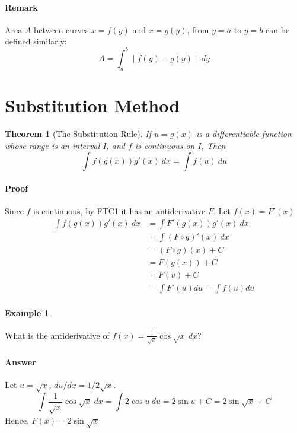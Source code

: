 \documentclass[12pt]{article}
\newtheorem{theorem}{Theorem}
\begin{document}
\paragraph{Remark} Area $A$ between curves $x = f(y)$ and $x = g(y)$, from $y = a$ to $y = b$ can be defined similarly:
\[
    A = \int_a^b \mid f(y) - g(y) \mid\: dy
\]

\section{Substitution Method}
\begin{theorem}[The Substitution Rule]
    If $u = g(x)$ is a differentiable function whose range is an interval $I$, and $f$ is continuous on $I$, Then
    \[
        \int f(g(x))g'(x)\: dx= \int f(u)\: du
    \]
\end{theorem}
\paragraph{Proof}
Since $f$ is continuous, by FTC1 it has an antiderivative $F$. Let $f(x) = F'(x)$
\begin{align*} 
    \int f(g(x))g'(x)\: dx &= \int F'(g(x)) g'(x)\: dx \\
    &= \int (F \circ g)'(x)\: dx \\
    &= (F \circ g)(x) + C \\
    &= F(g(x)) + C \\
    &= F(u) + C \\
    &= \int F'(u) du = \int f(u) du
\end{align*}

\paragraph{Example 1} What is the antiderivative of $f(x) = \frac{1}{\sqrt{x}} \cos{\sqrt{x}}\: dx$?
\paragraph{Answer} Let $u = \sqrt{x}$, $du/dx = 1/2\sqrt{x}$.
\[
    \int \frac{1}{\sqrt{x}} \cos{\sqrt{x}}\: dx = \int 2 \cos{u}\: du = 2 \sin{u} + C = 2 \sin{\sqrt{x}} + C
\] 
Hence, $F(x) = 2 \sin{\sqrt{x}}$
\end{document}
